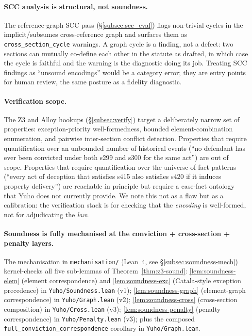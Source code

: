 \paragraph{SCC analysis is structural, not soundness.} The reference-graph
SCC pass (\S\ref{subsec:scc_eval}) flags non-trivial cycles in the
implicit/subsumes cross-reference graph and surfaces them as
\texttt{cross\_section\_cycle} warnings. A graph cycle is a finding,
not a defect: two sections can mutually co-define each other in the
statute as drafted, in which case the cycle is faithful and the
warning is the diagnostic doing its job. Treating SCC findings as
``unsound encodings'' would be a category error; they are entry
points for human review, the same posture as a fidelity diagnostic.

\paragraph{Verification scope.} The Z3 and Alloy hookups
(\S\ref{subsec:verify}) target a deliberately narrow set of properties:
exception-priority well-formedness, bounded element-combination
enumeration, and pairwise inter-section conflict detection. Properties
that require quantification over an unbounded number of historical
events (``no defendant has ever been convicted under both s299 and
s300 for the same act'') are out of scope. Properties that require
quantification over the universe of fact-patterns (``every act of
deception that satisfies s415 also satisfies s420 if it induces
property delivery'') are reachable in principle but require a
case-fact ontology that Yuho does not currently provide. We note this
not as a flaw but as a calibration: the verification stack is for
checking that the \emph{encoding} is well-formed, not for adjudicating
the \emph{law}.

\paragraph{Soundness is fully mechanised at the conviction +
cross-section + penalty layers.}
The mechanisation in \texttt{mechanisation/} (Lean~4, see
\S\ref{subsec:soundness-mech}) kernel-checks all five sub-lemmas
of Theorem~\ref{thm:z3-sound}:
\ref{lem:soundness-elem} (element correspondence) and
\ref{lem:soundness-exc} (Catala-style exception precedence) in
\texttt{Yuho/Soundness.lean} (v1);
\ref{lem:soundness-graph} (element-graph correspondence) in
\texttt{Yuho/Graph.lean} (v2);
\ref{lem:soundness-cross} (cross-section composition) in
\texttt{Yuho/Cross.lean} (v3);
\ref{lem:soundness-penalty} (penalty correspondence) in
\texttt{Yuho/Penalty.lean} (v3);
plus the composed \texttt{full\_conviction\_correspondence}
corollary in \texttt{Yuho/Graph.lean}.

